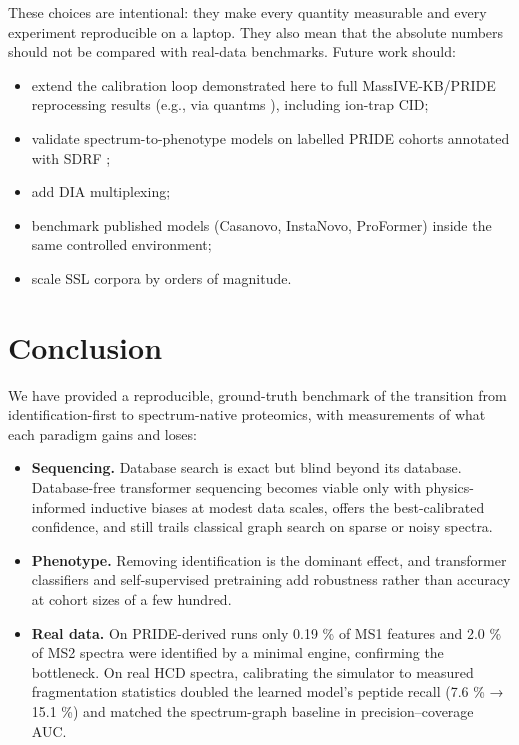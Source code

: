 \documentclass[pdflatex,sn-mathphys-num]{sn-jnl}
\begin{document}
These choices are intentional: they make every quantity measurable and every experiment reproducible on a laptop. They also mean that the absolute numbers should not be compared with real-data benchmarks. Future work should:

\begin{itemize}
\item
  extend the calibration loop demonstrated here to full MassIVE-KB/PRIDE reprocessing results (e.g., via quantms \cite{dai2024}), including ion-trap CID;
\item
  validate spectrum-to-phenotype models on labelled PRIDE cohorts annotated with SDRF \cite{dai2021};
\item
  add DIA multiplexing;
\item
  benchmark published models (Casanovo, InstaNovo, ProFormer) inside the same controlled environment;
\item
  scale SSL corpora by orders of magnitude.
\end{itemize}

\section{Conclusion}\label{sec:conclusion}
We have provided a reproducible, ground-truth benchmark of the transition from identification-first to spectrum-native proteomics, with measurements of what each paradigm gains and loses:

\begin{itemize}
\item
  \textbf{Sequencing.} Database search is exact but blind beyond its database. Database-free transformer sequencing becomes viable only with physics-informed inductive biases at modest data scales, offers the best-calibrated confidence, and still trails classical graph search on sparse or noisy spectra.
\item
  \textbf{Phenotype.} Removing identification is the dominant effect, and transformer classifiers and self-supervised pretraining add robustness rather than accuracy at cohort sizes of a few hundred.
\item
  \textbf{Real data.} On PRIDE-derived runs only 0.19 \% of MS1 features and 2.0 \% of MS2 spectra were identified by a minimal engine, confirming the bottleneck. On real HCD spectra, calibrating the simulator to measured fragmentation statistics doubled the learned model's peptide recall (7.6 \% → 15.1 \%) and matched the spectrum-graph baseline in precision--coverage AUC.
\end{itemize}
\end{document}
